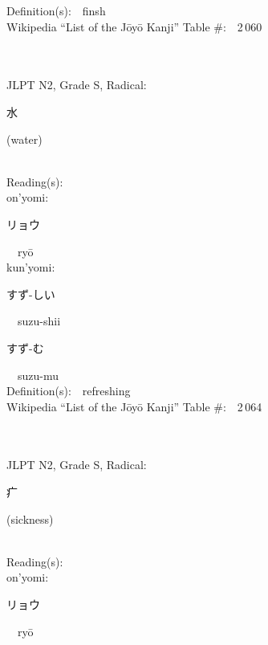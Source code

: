 \begin{multicols}{2}
Definition(s):\ \ finsh \\
Wikipedia ``List of the J\=oy\=o Kanji'' Table \#:\ \ 2\,060 \\
\ \ \\
{\fontsize{34pt}{40pt}  }\ \ \\  %
{JLPT N2, Grade S, Radical:\ \ {\begin{CJK}{UTF8}{min} 水 \end{CJK}} (water) } \\
Reading(s):\ \ \\
{\hspace*{1em}}on'yomi:\ \ \\
{\hspace*{2em}}{\begin{CJK}{UTF8}{min} リョウ \end{CJK}}\ \ ry\=o\ \ \\
{\hspace*{1em}}kun'yomi:\ \ \\
{\hspace*{2em}}{\begin{CJK}{UTF8}{min} すず-しい \end{CJK}}\ \ suzu-shii\ \ \\
{\hspace*{2em}}{\begin{CJK}{UTF8}{min} すず-む \end{CJK}}\ \ suzu-mu\ \ \\
Definition(s):\ \ refreshing \\
Wikipedia ``List of the J\=oy\=o Kanji'' Table \#:\ \ 2\,064 \\
\ \ \\
{\fontsize{34pt}{40pt}  }\ \ \\  %
{JLPT N2, Grade S, Radical:\ \ {\begin{CJK}{UTF8}{min} 疒 \end{CJK}} (sickness) } \\
Reading(s):\ \ \\
{\hspace*{1em}}on'yomi:\ \ \\
{\hspace*{2em}}{\begin{CJK}{UTF8}{min} リョウ \end{CJK}}\ \ ry\=o\ \ \\

\end{multicols}
